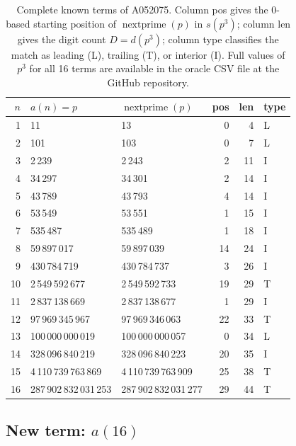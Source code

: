 \documentclass[11pt]{article}
\theoremstyle{definition}
\theoremstyle{remark}
\newcommand{\np}{\operatorname{nextprime}}
\begin{document}
\begin{table}[ht]
\begin{center}
\small
\begin{tabular}{rllrrl}
\toprule
$n$ & $a(n) = p$ & $\np(p)$ & pos & len & type \\
\midrule
1  & 11                & 13                & 0  & 4  & L \\
2  & 101               & 103               & 0  & 7  & L \\
3  & 2\,239            & 2\,243            & 2  & 11 & I \\
4  & 34\,297           & 34\,301           & 2  & 14 & I \\
5  & 43\,789           & 43\,793           & 4  & 14 & I \\
6  & 53\,549           & 53\,551           & 1  & 15 & I \\
7  & 535\,487          & 535\,489          & 1  & 18 & I \\
8  & 59\,897\,017      & 59\,897\,039      & 14 & 24 & I \\
9  & 430\,784\,719     & 430\,784\,737     & 3  & 26 & I \\
10 & 2\,549\,592\,677  & 2\,549\,592\,733  & 19 & 29 & T \\
11 & 2\,837\,138\,669  & 2\,837\,138\,677  & 1  & 29 & I \\
12 & 97\,969\,345\,967 & 97\,969\,346\,063 & 22 & 33 & T \\
13 & 100\,000\,000\,019 & 100\,000\,000\,057 & 0 & 34 & L \\
14 & 328\,096\,840\,219 & 328\,096\,840\,223 & 20 & 35 & I \\
15 & 4\,110\,739\,763\,869 & 4\,110\,739\,763\,909 & 25 & 38 & T \\
\midrule
16 & 287\,902\,832\,031\,253 & 287\,902\,832\,031\,277 & 29 & 44 & T \\
\bottomrule
\end{tabular}
\caption{Complete known terms of A052075.
Column pos gives the 0-based starting position of $\np(p)$ in $s(p^3)$;
column len gives the digit count $D = d(p^3)$;
column type classifies the match as leading (L), trailing (T),
or interior (I).
Full values of $p^3$ for all 16 terms are available in the oracle CSV
file at the GitHub repository.}
\label{tab:oracle}
\end{center}
\end{table}

\subsection{New term: \texorpdfstring{$a(16)$}{a(16)}}
\label{sec:a16}
\end{document}

